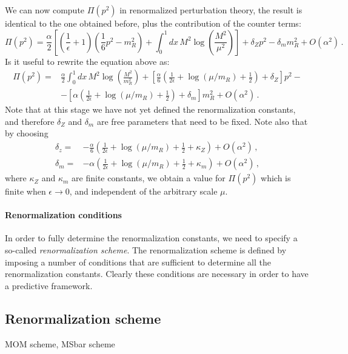 We can now compute $\Pi(p^2)$ in renormalized perturbation theory, the
result is identical to the one obtained before, plus the contribution
of the counter terms:
\begin{equation}
  \label{eq:PiRenormPertTh}
  \Pi(p^2)=\frac{\alpha}{2}\left[
    \left(\frac{1}{\epsilon}+1\right)
    \left(\frac{1}{6}p^2-m_R^2\right) +
    \int_0^1dx\, M^2\log\left(\frac{M^2}{\mu^2}\right)
  \right] + \delta_Z p^2 - \delta_m m_R^2 + O(\alpha^2)\, .
\end{equation}
Is it useful to rewrite the equation above as:
\begin{align}
  \Pi(p^2)
  =& \frac{\alpha}{2}\int_0^1dx\,
     M^2\log\left(\frac{M^2}{m_R^2}\right) +
     \left[
     \frac{\alpha}{6} \left(\frac{1}{2\epsilon} + \log(\mu/m_R) +
     \frac12 \right) + \delta_Z
     \right] p^2 - \nonumber \\
   & - \left[
     \alpha\left(\frac{1}{2\epsilon} + \log(\mu/m_R) +
     \frac12 \right) + \delta_m
     \right] m_R^2 + O\left(\alpha^2\right)\, .
\end{align}
Note that at this stage we have not yet defined the renormalization
constants, and therefore $\delta_Z$ and $\delta_m$ are free parameters
that need to be fixed.  Note also that by choosing
\begin{align}
  \delta_z =& -\frac{\alpha}{6} \left(\frac{1}{2\epsilon} + \log(\mu/m_R) +
              \frac12 + \kappa_Z \right) + O\left(\alpha^2\right)\, , \\
  \delta_m =& -\alpha\left(\frac{1}{2\epsilon} + \log(\mu/m_R) +
     \frac12 + \kappa_m\right) + O\left(\alpha^2\right)\, , 
\end{align}
where $\kappa_Z$ and $\kappa_m$ are finite constants, we obtain a
value for $\Pi(p^2)$ which is finite when $\epsilon\to 0$, and
independent of the arbitrary scale $\mu$.

\paragraph{Renormalization conditions}

In order to fully determine the renormalization constants, we need to
specify a so-called {\em renormalization scheme}. The renormalization
scheme is defined by imposing a number of conditions that are
sufficient to determine all the renormalization constants. Clearly these
conditions are necessary in order to have a predictive framework.

\subsection{Renormalization scheme}
\label{sec:renorm-scheme}

MOM scheme, MSbar scheme

